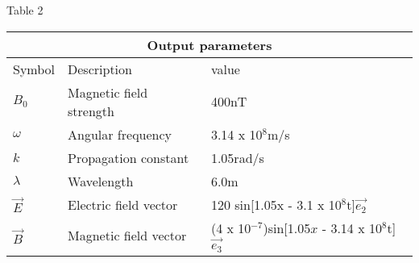 \setlength{\arrayrulewidth}{0.3mm}
\setlength{\tabcolsep}{15pt}
\renewcommand{\arraystretch}{1.5}

{Table 2}\\

\begin{tabular}{ |p{1cm}|p{1cm}|p{4.5cm}|  }
\hline
\multicolumn{3}{|c|}{Output parameters} \\
\hline
Symbol& Description&value\\
\hline
$B_0$ & Magnetic field strength & 400nT\\
\hline
$\omega$ & Angular frequency & 3.14 x 10$^8$m/s\\
\hline
$k$ &Propagation constant & 1.05rad/s\\
\hline
$\lambda$ & Wavelength & 6.0m\\
\hline
$\vec{E}$ & Electric field vector & 120 sin[1.05x - 3.1 x 10$^8$t]$\vec{e_2}$\\
\hline
$\vec{B}$ & Magnetic field vector & (4 x 10$^{-7}$)sin[1.05$x$ - 3.14 x 10$^8$t]$\vec{e_3}$\\
\hline
\end{tabular}
    